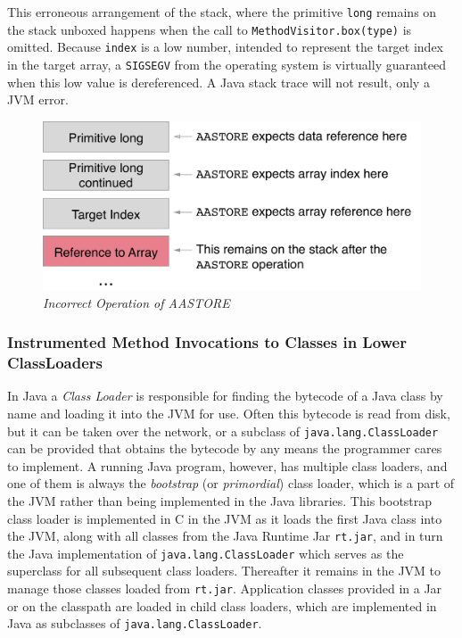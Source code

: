 \documentclass[]{final_report}
\begin{document}
This erroneous arrangement of the stack, where the primitive \lstinline{long} remains on the stack unboxed happens when the call to \lstinline{MethodVisitor.box(type)} is omitted. Because \lstinline{index} is a low number, intended to represent the target index in the target array, a \lstinline{SIGSEGV} from the operating system is virtually guaranteed when this low value is dereferenced. A Java stack trace will not result, only a JVM error.

\begin{figure}[!h]
\begin{center}
\includegraphics[scale=0.3]{figures/Incorrect_stack.pdf}
\caption{\small \sl Incorrect Operation of AASTORE \label{fig:incorrect_stack}}
\end{center} 
\end{figure}

\FloatBarrier

\subsubsection{Instrumented Method Invocations to Classes in Lower ClassLoaders \label{lower_classloaders}}

In Java a \textit{Class Loader} is responsible for finding the bytecode of a Java class by name and loading it into the JVM for use. Often this bytecode is read from disk, but it can be taken over the network, or a subclass of \lstinline{java.lang.ClassLoader}\noop{} can be provided that obtains the bytecode by any means the programmer cares to implement. A running Java program, however, has multiple class loaders, and one of them is always the \textit{bootstrap} (or \textit{primordial}) class loader, which is a part of the JVM rather than being implemented in the Java libraries. This bootstrap class loader is implemented in C in the JVM as it loads the first Java class into the JVM, along with all classes from the Java Runtime Jar \lstinline{rt.jar}, and in turn the Java implementation of \lstinline{java.lang.ClassLoader} which serves as the superclass for all subsequent class loaders. Thereafter it remains in the JVM to manage those classes loaded from \lstinline{rt.jar}\noop{}. Application classes provided in a Jar or on the classpath are loaded in child class loaders, which are implemented in Java as subclasses of \lstinline{java.lang.ClassLoader}.\noop{}
\end{document}
